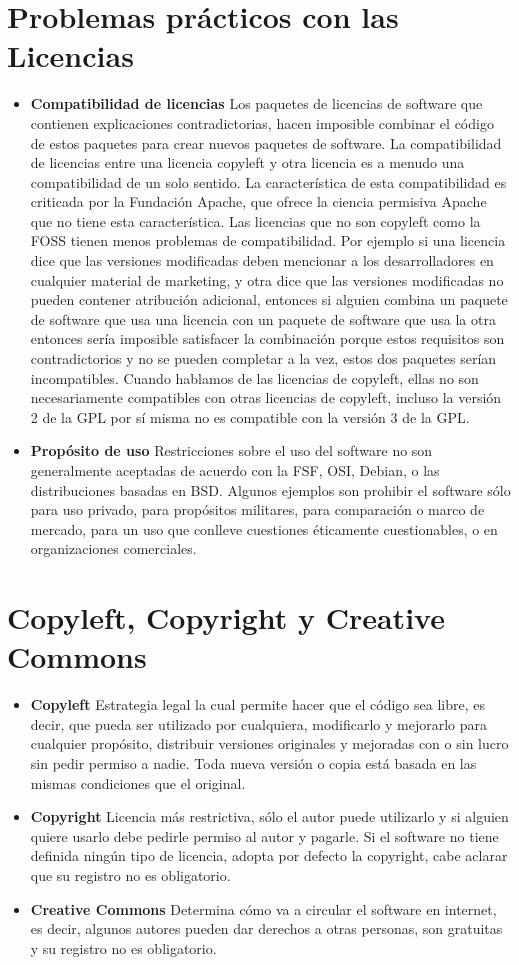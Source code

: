 \section {Problemas prácticos con las Licencias}
\begin{itemize}
	\item {\bf Compatibilidad de licencias}
Los paquetes de licencias de software que contienen explicaciones contradictorias, hacen imposible combinar el código de estos paquetes para crear nuevos paquetes de software. La compatibilidad de licencias entre una licencia copyleft y otra licencia es a menudo una compatibilidad de un solo sentido. La característica de esta compatibilidad es criticada por la Fundación Apache, que ofrece la ciencia permisiva Apache que no tiene esta característica. Las licencias que no son copyleft como la FOSS tienen menos problemas de compatibilidad. Por ejemplo si una licencia dice que las versiones modificadas deben mencionar a los desarrolladores en cualquier material de marketing, y otra dice que las versiones modificadas no pueden contener atribución adicional, entonces si alguien combina un paquete de software que usa una licencia con un paquete de software que usa la otra entonces sería imposible satisfacer la combinación porque estos requisitos son contradictorios y no se pueden completar a la vez, estos dos paquetes serían incompatibles. Cuando hablamos de las licencias de copyleft, ellas no son necesariamente compatibles con otras licencias de copyleft, incluso la versión 2 de la GPL por sí misma no es compatible con la versión 3 de la GPL.
	\item {\bf Propósito de uso}
Restricciones sobre el uso del software no son generalmente aceptadas de acuerdo con la FSF, OSI, Debian, o las distribuciones basadas en BSD. Algunos ejemplos son prohibir el software sólo para uso privado, para propósitos militares, para comparación o marco de mercado, para un uso que conlleve cuestiones éticamente cuestionables, o en organizaciones comerciales.
\end{itemize}
\newpage
\section {Copyleft, Copyright y Creative Commons}
\begin{itemize}
\item {\bf Copyleft}
Estrategia legal la cual permite hacer que el código sea libre, es decir, que pueda ser utilizado por cualquiera, modificarlo y mejorarlo para cualquier propósito, distribuir versiones originales y mejoradas con o sin lucro sin pedir permiso a nadie. Toda nueva versión o copia está basada en las mismas condiciones que el original.
\item {\bf Copyright}
Licencia más restrictiva, sólo el autor puede utilizarlo y si alguien quiere usarlo debe pedirle permiso al autor y pagarle. Si el software no tiene definida ningún tipo de licencia, adopta por defecto la copyright, cabe aclarar que su registro no es obligatorio. 
\item {\bf Creative Commons}
Determina cómo va a circular el software en internet, es decir, algunos autores pueden dar derechos a otras personas, son gratuitas y su registro no es obligatorio.
\end{itemize}
\newpage
